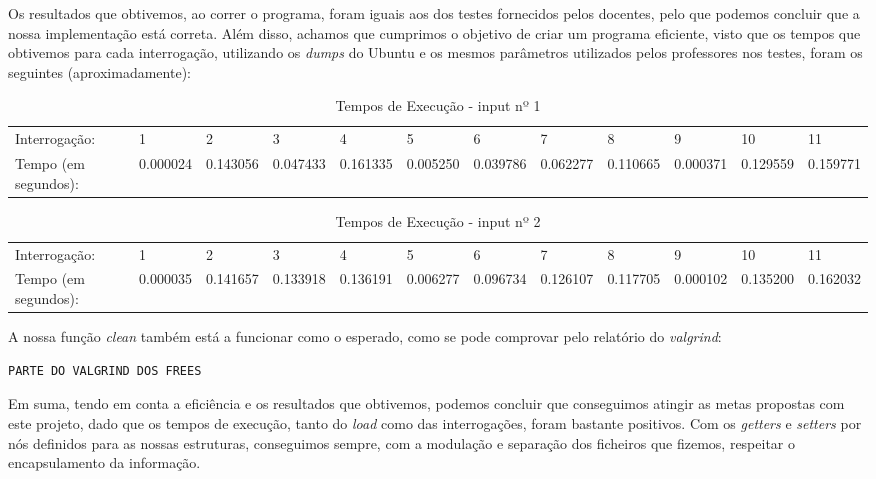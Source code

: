 \documentclass[a4paper, 11pt, oneside]{article}
\begin{document}
Os resultados que obtivemos, ao correr o programa, foram iguais aos dos testes fornecidos pelos docentes, pelo que podemos concluir que a nossa implementação está correta. Além disso, achamos que cumprimos o objetivo de criar um programa eficiente, visto que os tempos que obtivemos para cada interrogação, utilizando os \textit{dumps} do Ubuntu e os mesmos parâmetros utilizados pelos professores nos testes, foram os seguintes (aproximadamente):
\begin{table}[h]
\centering
\caption{Tempos de Execução - input nº 1}
\begin{tabular}{llllllllllll}
Interrogação:        & 1 & 2 & 3 & 4 & 5 & 6 & 7 & 8 & 9 & 10 & 11 \\
Tempo (em segundos): & 0.000024 & 0.143056 & 0.047433 & 0.161335 & 0.005250 & 0.039786 & 0.062277 & 0.110665 & 0.000371 & 0.129559  & 0.159771
\end{tabular}
\end{table}

\begin{table}[h]
\centering
\caption{Tempos de Execução - input nº 2}
\begin{tabular}{llllllllllll}
Interrogação:        & 1 & 2 & 3 & 4 & 5 & 6 & 7 & 8 & 9 & 10 & 11 \\
Tempo (em segundos): & 0.000035 & 0.141657 & 0.133918 & 0.136191 & 0.006277 & 0.096734 & 0.126107 & 0.117705 & 0.000102 & 0.135200  & 0.162032
\end{tabular}
\end{table}

A nossa função \textit{clean} também está a funcionar como o esperado, como se pode comprovar pelo relatório do \textit{valgrind}:
\begin{verbatim}
PARTE DO VALGRIND DOS FREES
\end{verbatim}

Em suma, tendo em conta a eficiência e os resultados que obtivemos, podemos concluir que conseguimos atingir as metas propostas com este projeto, dado que os tempos de execução, tanto do \textit{load} como das interrogações, foram bastante positivos. Com os \textit{getters} e \textit{setters} por nós definidos para as nossas estruturas, conseguimos sempre, com a modulação e separação dos ficheiros que fizemos, respeitar o encapsulamento da informação.
\end{document}
